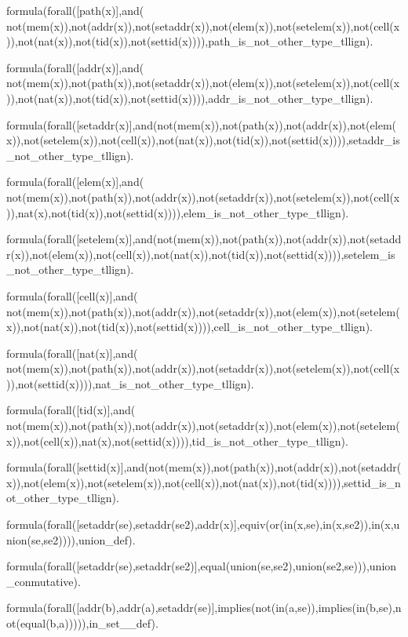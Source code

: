formula(forall([path(x)],and(   not(mem(x)),not(addr(x)),not(setaddr(x)),not(elem(x)),not(setelem(x)),not(cell(x)),not(nat(x)),not(tid(x)),not(settid(x)))),path\_is\_not\_other\_type\_tllign).

formula(forall([addr(x)],and(   not(mem(x)),not(path(x)),not(setaddr(x)),not(elem(x)),not(setelem(x)),not(cell(x)),not(nat(x)),not(tid(x)),not(settid(x)))),addr\_is\_not\_other\_type\_tllign).

formula(forall([setaddr(x)],and(not(mem(x)),not(path(x)),not(addr(x)),not(elem(x)),not(setelem(x)),not(cell(x)),not(nat(x)),not(tid(x)),not(settid(x)))),setaddr\_is\_not\_other\_type\_tllign).

formula(forall([elem(x)],and(   not(mem(x)),not(path(x)),not(addr(x)),not(setaddr(x)),not(setelem(x)),not(cell(x)),nat(x),not(tid(x)),not(settid(x)))),elem\_is\_not\_other\_type\_tllign).

formula(forall([setelem(x)],and(not(mem(x)),not(path(x)),not(addr(x)),not(setaddr(x)),not(elem(x)),not(cell(x)),not(nat(x)),not(tid(x)),not(settid(x)))),setelem\_is\_not\_other\_type\_tllign).

formula(forall([cell(x)],and(   not(mem(x)),not(path(x)),not(addr(x)),not(setaddr(x)),not(elem(x)),not(setelem(x)),not(nat(x)),not(tid(x)),not(settid(x)))),cell\_is\_not\_other\_type\_tllign).

formula(forall([nat(x)],and(    not(mem(x)),not(path(x)),not(addr(x)),not(setaddr(x)),not(setelem(x)),not(cell(x)),not(settid(x)))),nat\_is\_not\_other\_type\_tllign).

formula(forall([tid(x)],and(    not(mem(x)),not(path(x)),not(addr(x)),not(setaddr(x)),not(elem(x)),not(setelem(x)),not(cell(x)),nat(x),not(settid(x)))),tid\_is\_not\_other\_type\_tllign).

formula(forall([settid(x)],and(not(mem(x)),not(path(x)),not(addr(x)),not(setaddr(x)),not(elem(x)),not(setelem(x)),not(cell(x)),not(nat(x)),not(tid(x)))),settid\_is\_not\_other\_type\_tllign).







formula(forall([setaddr(se),setaddr(se2),addr(x)],equiv(or(in(x,se),in(x,se2)),in(x,union(se,se2)))),union\_def).

formula(forall([setaddr(se),setaddr(se2)],equal(union(se,se2),union(se2,se))),union\_conmutative).

formula(forall([addr(b),addr(a),setaddr(se)],implies(not(in(a,se)),implies(in(b,se),not(equal(b,a))))),in\_set\_\_def).

